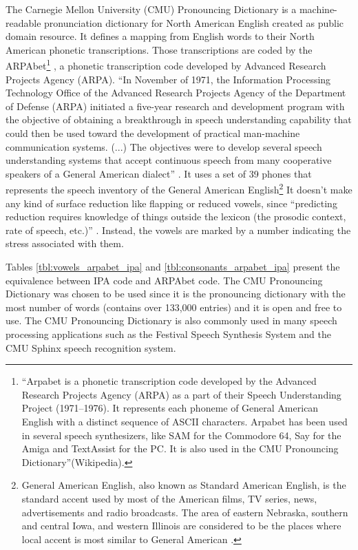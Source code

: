 The Carnegie Mellon University (CMU) Pronouncing Dictionary is a 
machine-readable pronunciation dictionary for North American English
created as public domain resource. It defines a mapping from English
words to their North American phonetic transcriptions. 
Those transcriptions are coded by the ARPAbet\footnote{
``Arpabet is a phonetic transcription code developed by the Advanced Research Projects Agency (ARPA) as a part of their Speech Understanding Project (1971--1976). It represents each phoneme of General American English with a distinct sequence of ASCII characters. Arpabet has been used in several speech synthesizers, like SAM for the Commodore 64, Say for the Amiga and TextAssist for the PC. It is also used in the CMU Pronouncing Dictionary''(Wikipedia).
} \citep{Shoup1988}, a phonetic transcription 
code developed by Advanced Research Projects Agency (ARPA).
``In November of 1971, the Information Processing Technology Office of the
Advanced Research Projects Agency of the Department of Defense (ARPA) 
initiated a five-year research and development program with the
objective of obtaining a breakthrough in speech understanding capability
that could then be used toward the development of practical man-machine
communication systems. (...) The objectives were to develop several
speech understanding systems that accept continuous speech from many 
cooperative speakers of a General American dialect'' \citep{klatt1977}.
It uses a set of 39 phones that represents the speech inventory of the 
General American English\footnote{
General American English, also known as Standard American English, is the standard
accent used by most of the American films, TV series, news, advertisements and radio
broadcasts. The area of eastern Nebraska, southern and central Iowa, and western Illinois
are considered to be the places where local accent is most similar to General American
\citep{labov2006atlas}.
}
It doesn't make any 
kind of surface reduction like flapping or reduced vowels, since
``predicting reduction requires knowledge of things outside the lexicon (the prosodic context, 
rate of speech, etc.)'' \citep{jurafsky2009speech}.
Instead, the vowels are marked by a number indicating the stress associated with them.


Tables \ref{tbl:vowels_arpabet_ipa} and \ref{tbl:consonants_arpabet_ipa} 
present the equivalence between IPA code and ARPAbet code.
The CMU Pronouncing Dictionary was chosen to be used since it 
is the pronouncing dictionary with the most number of words (contains over 133,000 entries) 
and it is open and free to use.
The CMU Pronouncing Dictionary is also commonly
used in many speech processing applications such as the 
Festival Speech Synthesis System and the CMU Sphinx speech recognition system.

